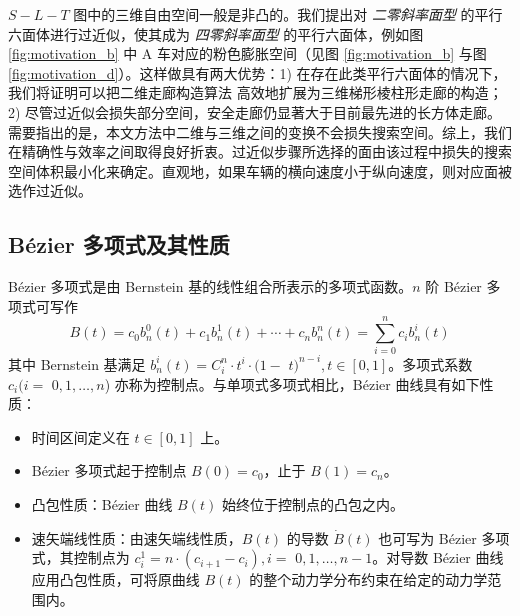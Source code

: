 \documentclass[UTF8,a4paper,12pt,fontset=none]{ctexart}
\theoremstyle{definition}
\theoremstyle{plain}
\theoremstyle{plain}
\theoremstyle{plain}
\begin{document}
 $S-L-T$ 图中的三维自由空间一般是非凸的。我们提出对 \emph{二零斜率面型} 的平行六面体进行过近似，使其成为 \emph{四零斜率面型} 的平行六面体，例如图 \ref{fig:motivation_b} 中 A 车对应的粉色膨胀空间（见图 \ref{fig:motivation_b} 与图 \ref{fig:motivation_d}）。这样做具有两大优势：1) 在存在此类平行六面体的情况下，我们将证明可以把二维走廊构造算法 \cite{li_motion_nodate} 高效地扩展为三维梯形棱柱形走廊的构造；2) 尽管过近似会损失部分空间，安全走廊仍显著大于目前最先进的长方体走廊。需要指出的是，本文方法中二维与三维之间的变换不会损失搜索空间。综上，我们在精确性与效率之间取得良好折衷。过近似步骤所选择的面由该过程中损失的搜索空间体积最小化来确定。直观地，如果车辆的横向速度小于纵向速度，则对应面被选作过近似。

\subsection{B\'{e}zier 多项式及其性质}

B\'{e}zier 多项式是由 Bernstein 基的线性组合所表示的多项式函数。$n$ 阶 B\'{e}zier 多项式可写作
$$
B(t)=c_{0} b_{n}^{0}(t)+c_{1} b_{n}^{1}(t)+\cdots+c_{n} b_{n}^{n}(t)=\sum_{i=0}^{n} c_{i} b_{n}^{i}(t)
$$
其中 Bernstein 基满足 $b_{n}^{i}(t)=C_{i}^{n} \cdot t^{i} \cdot(1-$ $t)^{n-i}, t \in[0,1]$。多项式系数 $c_{i}(i=$ $0,1, \ldots, n$) 亦称为控制点。与单项式多项式相比，B\'{e}zier 曲线具有如下性质：


\begin{itemize}
    \item 时间区间定义在 $t \in[0,1]$ 上。
    \item B\'{e}zier 多项式起于控制点 $B(0)=c_{0}$，止于 $B(1)=c_{n}$。
    \item 凸包性质：B\'{e}zier 曲线 $B(t)$ 始终位于控制点的凸包之内。
    \item 速矢端线性质：由速矢端线性质，$B(t)$ 的导数 $\dot{B}(t)$ 也可写为 B\'{e}zier 多项式，其控制点为 $c_{i}^{1}=n \cdot\left(c_{i+1}-c_{i}\right), i=$ $0,1, \ldots, n-1$。对导数 B\'{e}zier 曲线应用凸包性质，可将原曲线 $B(t)$ 的整个动力学分布约束在给定的动力学范围内。
\end{itemize}
\end{document}
